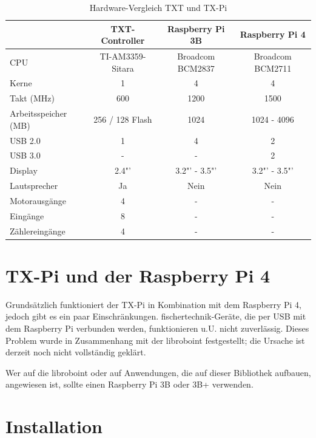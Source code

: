 \documentclass[
  paper=A4,
  ngerman,
  fontsize=12pt,
  parskip=half-,
]{scrbook}
\begin{document}
\begin{table}[ht]
\begin{tabular}{lccc}
                      & \textbf{TXT-Controller}   & \textbf{Raspberry Pi 3B}     & \textbf{Raspberry Pi 4} \\
\midrule
CPU                   & TI-AM3359-Sitara & Broadcom BCM2837    & Broadcom BCM2711 \\
Kerne                 & 1                & 4                   & 4 \\
Takt (MHz)            & 600              & 1200                & 1500 \\
Arbeitsspeicher (MB)  & 256 / 128 Flash  & 1024                & 1024 - 4096 \\
USB 2.0               & 1                & 4                   & 2 \\
USB 3.0               & -                & -                   & 2 \\
Display					 & 2.4"'              & 3.2"' - 3.5"'      & 3.2"' - 3.5"' \\
Lautsprecher          & Ja               & Nein                & Nein \\
Motorausgänge         & 4                & -                   & - \\
Eingänge              & 8                & -                   & - \\
Zählereingänge        & 4                & -                   & -
\end{tabular}
\caption{Hardware-Vergleich TXT und TX-Pi}
\label{tab:comparison}
\end{table}


\chapter{TX-Pi und der Raspberry Pi 4}

Grundsätzlich funktioniert der TX-Pi in Kombination mit dem Raspberry Pi 4, jedoch gibt
es ein paar Einschränkungen. fischertechnik-Geräte, die per USB mit dem Raspberry Pi
verbunden werden, funktionieren u.U. nicht zuverlässig. Dieses Problem wurde in
Zusammenhang mit der libroboint festgestellt; die Ursache ist derzeit noch nicht
vollständig geklärt. 

Wer auf die libroboint oder auf Anwendungen, die auf dieser Bibliothek aufbauen,
angewiesen ist, sollte einen Raspberry Pi 3B oder 3B+ verwenden.


\chapter{Installation}
\end{document}
